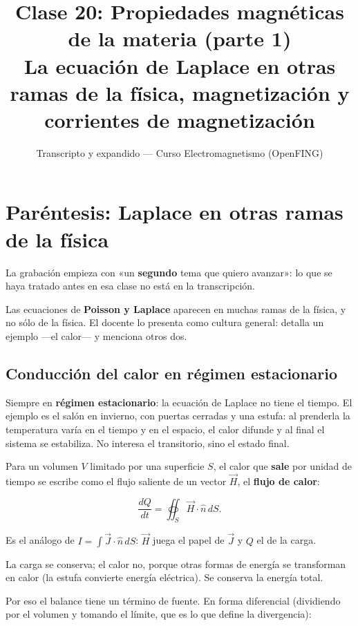\documentclass[12pt,a4paper]{article}
\title{\textbf{Clase 20: Propiedades magnéticas de la materia (parte 1)} \\[0.3em]
        \large{La ecuación de Laplace en otras ramas de la física, magnetización y corrientes de magnetización}}
\author{Transcripto y expandido --- Curso Electromagnetismo (OpenFING)}
\date{}
\begin{document}
\maketitle
\thispagestyle{empty}
\newpage

\tableofcontents
\newpage

\section{Paréntesis: Laplace en otras ramas de la física}

\begin{notebox}
La grabación empieza con «un \textbf{segundo} tema que quiero avanzar»: lo que se
haya tratado antes en esa clase no está en la transcripción.
\end{notebox}

Las ecuaciones de \textbf{Poisson y Laplace} aparecen en muchas ramas de la física, y
no sólo de la física. El docente lo presenta como cultura general: detalla un
ejemplo ---el calor--- y menciona otros dos.

\subsection{Conducción del calor en régimen estacionario}

Siempre en \textbf{régimen estacionario}: la ecuación de Laplace no tiene el tiempo.
El ejemplo es el salón en invierno, con puertas cerradas y una estufa: al
prenderla la temperatura varía en el tiempo y en el espacio, el calor difunde y
al final el sistema se estabiliza. No interesa el transitorio, sino el estado
final.

Para un volumen $V$ limitado por una superficie $S$, el calor que \textbf{sale} por
unidad de tiempo se escribe como el flujo saliente de un vector $\vec H$, el
\textbf{flujo de calor}:

\[
\frac{dQ}{dt} = \oiint_S \vec H\cdot\hat n\,dS .
\]

Es el análogo de $I = \int\vec J\cdot\hat n\,dS$: $\vec H$ juega el papel de
$\vec J$ y $Q$ el de la carga.

\begin{warnbox}
La carga
se conserva; el calor no, porque otras formas de energía se transforman en
calor (la estufa convierte energía eléctrica). Se conserva la energía total.
\end{warnbox}

Por eso el balance tiene un término de fuente. En forma diferencial (dividiendo
por el volumen y tomando el límite, que es lo que define la divergencia):
\end{document}
